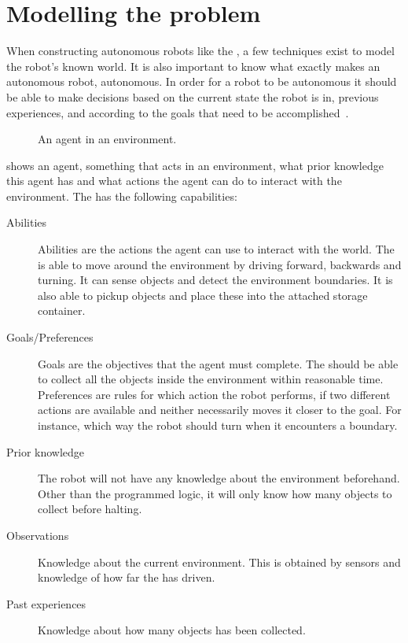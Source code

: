 \section{Modelling the problem} \label{sec:model}

When constructing autonomous robots like the \projname{}, a few techniques exist to model the robot's known world. It is also important to know what exactly makes an autonomous robot, autonomous. In order for a robot to be autonomous it should be able to make decisions based on the current state the robot is in, previous experiences, and according to the goals that need to be accomplished~\citep{artificialintelligencebook}. 

\begin{figure}[H]
     \caption{\label{fig:model_mi_agent} An agent in an environment.}
\end{figure}

 shows an agent, something that acts in an environment, what prior knowledge this agent has and what actions the agent can do to interact with the environment. The \projname{} has the following capabilities:

\begin{description}
\item[Abilities] Abilities are the actions the agent can use to interact with the world. The \projname{} is able to move around the environment by driving forward, backwards and turning. It can sense objects and detect the environment boundaries. It is also able to pickup objects and place these into the attached storage container.  
\item[Goals/Preferences] Goals are the objectives that the agent must complete. The \projname{} should be able to collect all the objects inside the environment within reasonable time. Preferences are rules for which action the robot performs, if two different actions are available and neither necessarily moves it closer to the goal. For instance, which way the robot should turn when it encounters a boundary.
\item[Prior knowledge] The robot will not have any knowledge about the environment beforehand. Other than the programmed logic, it will only know how many objects to collect before halting.
\item[Observations] Knowledge about the current environment. This is obtained by sensors and knowledge of how far the \projname{} has driven. 
\item[Past experiences] Knowledge about how many objects has been collected. 
\end{description}

